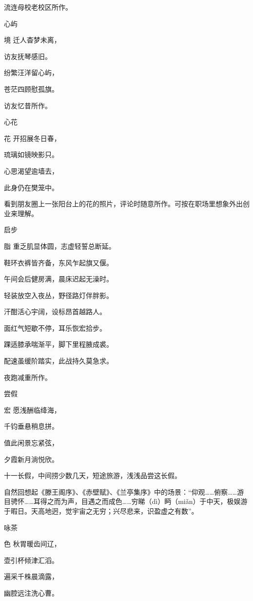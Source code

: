\documentclass{article}
\newenvironment{poem}[3]{
\begin{minipage}{\textwidth}
\begin{pinyinscope}\begin{center}\Large\linespread{1.4}\selectfont #2\end{center}\end{pinyinscope}
\begin{pinyinscope}
	\begin{center}
	\Large\linespread{1.4}\rmfamily\selectfont #3
}{\end{center}
\end{pinyinscope}
\end{minipage}
}
\begin{document}
流连母校老校区所作。

\begin{poem}{}{心屿}
境迁人杳梦未离，

访友抚琴感旧{}。

纷繁汪洋留心屿，

苍茫四顾慰孤旗。
\end{poem}

访友忆昔所作。

\begin{poem}{}{心花}
花开招展冬日春，

琉璃如镜映影只。

心思渴望逾墙去，

此身仍在樊笼中。
\end{poem}

看到朋友圈上一张阳台上的花的照片，评论时随意所作。可按在职场里想象外出创业来理解。

\begin{poem}{}{启步}
脂重乏肌显体圆，志虚轻誓总断延。

鞋环衣裤皆齐备，东风乍起旗又偃。

午间会后健房满，晨床迟起无澡时。

轻装放空入夜丛，野径路灯伴胖影。

汗酣{}活心宇阔，设标昂首越路人。

面红气短歇不停，耳乐恢宏{}拾步。

踝适膝承喘渐平，脚下里程腋成裘。

配速虽缓阶踏实，此战持久莫急求。
\end{poem}

夜跑减重所作。

\begin{poem}{}{尝假}
宏愿浅酬临绛海，

千钧垂悬稍息拼。

值此闲景忘紧弦，

夕霞新月淌悦欣。
\end{poem}

十一长假，中间捞少数几天，短途旅游，浅浅品尝这长假。

自然回想起《滕王阁序》、《赤壁赋》、《兰亭集序》中的场景：“仰观……俯察……游目骋怀……耳得之而为声，目遇之而成色……穷睇（dì）眄（miǎn）于中天，极娱游于暇日。天高地迥，觉宇宙之无穷；兴尽悲来，识盈虚之有数”。

\begin{poem}{}{咏茶}
色秋胃暖齿间辽，

壶引杯倾津汇滔。

遍采千株晨滴露，

幽腔远注洗心曹。
\end{poem}
\end{document}
